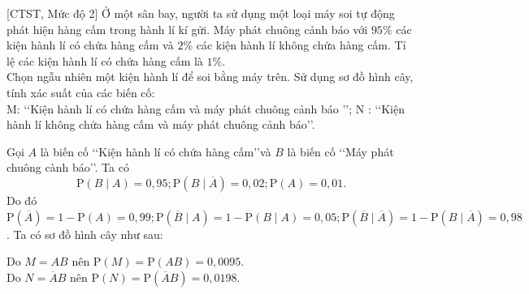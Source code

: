 \begin{bt}%
[CTST, Mức độ 2]%
	Ở một sân bay, người ta sử dụng một loại máy soi tự động phát hiện hàng cấm trong hành lí kí gửi. Máy phát chuông cảnh báo với $95 \%$ các kiện hành lí có chứa hàng cấm và $2 \%$ các kiện hành lí không chứa hàng cấm. Tỉ lệ các kiện hành lí có chứa hàng cấm là $1 \%$.\\
	Chọn ngẫu nhiên một kiện hành lí để soi bằng máy trên. Sử dụng sơ đồ hình cây, tính xác suất của các biến cố:\\
	M: \lq\lq Kiện hành lí có chứa hàng cấm và máy phát chuông cảnh báo \rq\rq;
	N : \lq\lq Kiện hành lí không chứa hàng cấm và máy phát chuông cảnh báo\rq\rq.
	\loigiai
	{
		Gọi $A$ là biến cố \lq\lq Kiện hành lí có chứa hàng cấm\rq\rq và $B$ là biến cố \lq\lq Máy phát chuông cành báo\rq\rq. Ta có
		$$
		\mathrm{P}(B \mid A)=0{,}95 ; \mathrm{P}(B \mid \overline{A})=0{,}02 ; \mathrm{P}(A)=0{,}01.
		$$
		Do đó $\mathrm{P}(\overline{A})=1-\mathrm{P}(A)=0{,}99 ; \mathrm{P}(\overline{B} \mid A)=1-\mathrm{P}(B \mid A)=0{,}05 ; \mathrm{P}(\overline{B} \mid \overline{A})=1-\mathrm{P}(B \mid \overline{A})=0{,}98$.
		Ta có sơ đồ hình cây như sau:
		\begin{center}
		\end{center}
		Do $M=A B$ nên $\mathrm{P}(M)=\mathrm{P}(A B)=0{,}0095$.\\
		Do $N=\overline{A} B$ nên $\mathrm{P}(N)=\mathrm{P}(\overline{A} B)=0{,}0198$.
	}
\end{bt}

